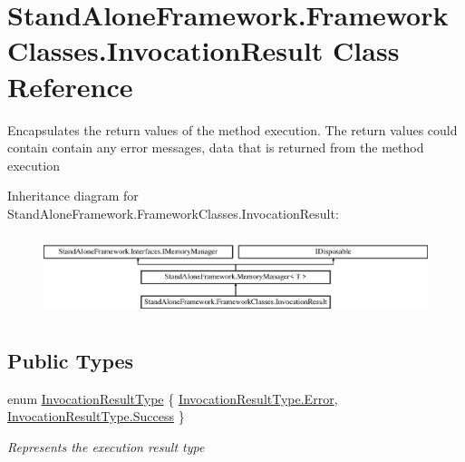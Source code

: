 \hypertarget{class_stand_alone_framework_1_1_framework_classes_1_1_invocation_result}{\section{Stand\+Alone\+Framework.\+Framework\+Classes.\+Invocation\+Result Class Reference}
\label{class_stand_alone_framework_1_1_framework_classes_1_1_invocation_result}
}


Encapsulates the return values of the method execution. The return values could contain contain any error messages, data that is returned from the method execution  


Inheritance diagram for Stand\+Alone\+Framework.\+Framework\+Classes.\+Invocation\+Result\+:\begin{figure}[H]
\begin{center}
\leavevmode
\includegraphics[height=2.366197cm]{class_stand_alone_framework_1_1_framework_classes_1_1_invocation_result}
\end{center}
\end{figure}
\subsection*{Public Types}
\begin{DoxyCompactItemize}
\item 
enum \hyperlink{class_stand_alone_framework_1_1_framework_classes_1_1_invocation_result_a536bbf61143c8a5b8364bf7c77896ba4}{Invocation\+Result\+Type} \{ \hyperlink{class_stand_alone_framework_1_1_framework_classes_1_1_invocation_result_a536bbf61143c8a5b8364bf7c77896ba4a902b0d55fddef6f8d651fe1035b7d4bd}{Invocation\+Result\+Type.\+Error}, 
\hyperlink{class_stand_alone_framework_1_1_framework_classes_1_1_invocation_result_a536bbf61143c8a5b8364bf7c77896ba4a505a83f220c02df2f85c3810cd9ceb38}{Invocation\+Result\+Type.\+Success}
 \}
\begin{DoxyCompactList}\small\item\em Represents the execution result type \end{DoxyCompactList}\end{DoxyCompactItemize}
